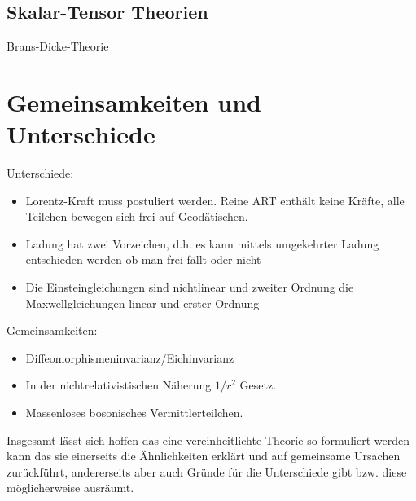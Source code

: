 \subsection{Skalar-Tensor Theorien}
Brans-Dicke-Theorie
\section{Gemeinsamkeiten und Unterschiede}
Unterschiede:
\begin{itemize}
  	\item Lorentz-Kraft muss postuliert werden. Reine ART enthält keine Kräfte,
 	alle Teilchen bewegen sich frei auf Geodätischen.
	\item Ladung hat zwei Vorzeichen, d.h. es kann mittels umgekehrter Ladung
	entschieden werden ob man frei fällt oder nicht
	\item Die Einsteingleichungen sind nichtlinear und zweiter Ordnung die
	Maxwellgleichungen linear und erster Ordnung
\end{itemize}
Gemeinsamkeiten:
\begin{itemize}
  	\item Diffeomorphismeninvarianz/Eichinvarianz
	\item In der nichtrelativistischen Näherung $1/r^2$ Gesetz.
	\item Massenloses bosonisches Vermittlerteilchen.
\end{itemize}
Insgesamt lässt sich hoffen das eine vereinheitlichte Theorie so formuliert
werden kann das sie einerseits die Ähnlichkeiten erklärt und auf gemeinsame
Ursachen zurückführt, andererseits aber auch Gründe für die Unterschiede gibt
bzw. diese möglicherweise ausräumt.

